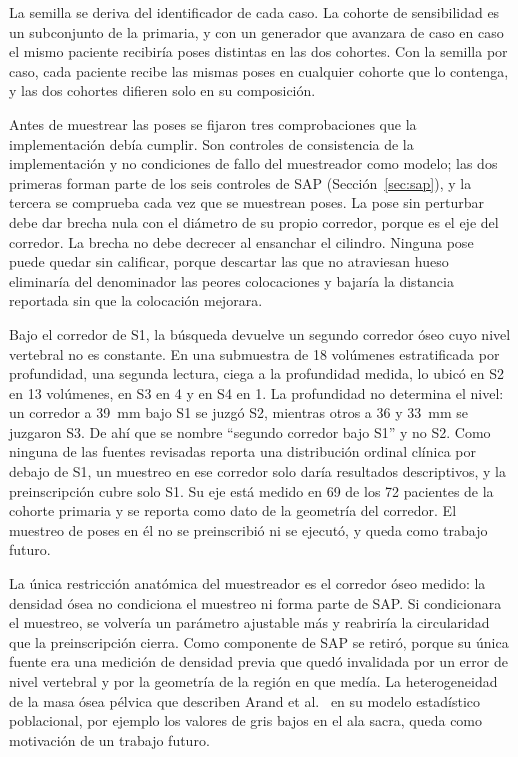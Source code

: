 La semilla se deriva del identificador de cada caso. La cohorte de sensibilidad es un subconjunto de la primaria, y con un generador que avanzara de caso en caso el mismo paciente recibiría poses distintas en las dos cohortes. Con la semilla por caso, cada paciente recibe las mismas poses en cualquier cohorte que lo contenga, y las dos cohortes difieren solo en su composición.

Antes de muestrear las poses se fijaron tres comprobaciones que la implementación debía cumplir. Son controles de consistencia de la implementación y no condiciones de fallo del muestreador como modelo; las dos primeras forman parte de los seis controles de SAP (Sección~\ref{sec:sap}), y la tercera se comprueba cada vez que se muestrean poses. La pose sin perturbar debe dar brecha nula con el diámetro de su propio corredor, porque es el eje del corredor. La brecha no debe decrecer al ensanchar el cilindro. Ninguna pose puede quedar sin calificar, porque descartar las que no atraviesan hueso eliminaría del denominador las peores colocaciones y bajaría la distancia reportada sin que la colocación mejorara.

Bajo el corredor de S1, la búsqueda devuelve un segundo corredor óseo cuyo nivel vertebral no es constante. En una submuestra de 18 volúmenes estratificada por profundidad, una segunda lectura, ciega a la profundidad medida, lo ubicó en S2 en 13 volúmenes, en S3 en 4 y en S4 en 1. La profundidad no determina el nivel: un corredor a 39~mm bajo S1 se juzgó S2, mientras otros a 36 y 33~mm se juzgaron S3. De ahí que se nombre ``segundo corredor bajo S1'' y no S2. Como ninguna de las fuentes revisadas reporta una distribución ordinal clínica por debajo de S1, un muestreo en ese corredor solo daría resultados descriptivos, y la preinscripción cubre solo S1. Su eje está medido en 69 de los 72 pacientes de la cohorte primaria y se reporta como dato de la geometría del corredor. El muestreo de poses en él no se preinscribió ni se ejecutó, y queda como trabajo futuro.

La única restricción anatómica del muestreador es el corredor óseo medido: la densidad ósea no condiciona el muestreo ni forma parte de SAP. Si condicionara el muestreo, se volvería un parámetro ajustable más y reabriría la circularidad que la preinscripción cierra. Como componente de SAP se retiró, porque su única fuente era una medición de densidad previa que quedó invalidada por un error de nivel vertebral y por la geometría de la región en que medía. La heterogeneidad de la masa ósea pélvica que describen Arand et al.~\cite{arand2019pelvicring} en su modelo estadístico poblacional, por ejemplo los valores de gris bajos en el ala sacra, queda como motivación de un trabajo futuro.

